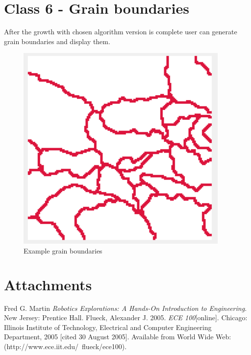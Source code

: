 \documentclass[a4paper, 11pt]{article}
\begin{document}
\section*{Class 6 - Grain boundaries}
After the growth with chosen algorithm version is complete user can generate grain boundaries and display them.
\begin{figure}[H]
\centering
  \includegraphics[]{GrainBoundariesExample}
  \caption{Example grain boundaries}
  \label{fig:boat1}
\end{figure}
\section*{Attachments}

\begin{thebibliography}{9}
 Fred G. Martin \emph{Robotics Explorations: A Hands-On Introduction to Engineering}. New Jersey: Prentice Hall.
  Flueck, Alexander J. 2005. \emph{ECE 100}[online]. Chicago: Illinois Institute of Technology, Electrical and Computer Engineering Department, 2005 [cited 30
August 2005]. Available from World Wide Web: (http://www.ece.iit.edu/~flueck/ece100).


\end{thebibliography}
\end{document}

